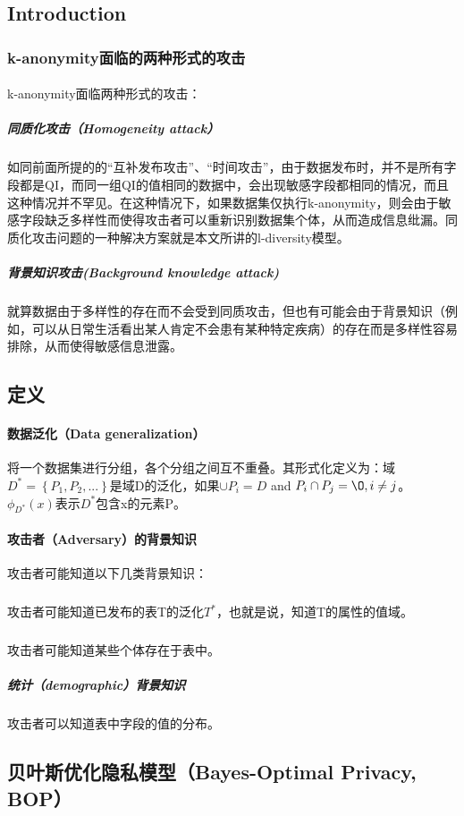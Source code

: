 \documentclass[12pt,a4paper]{article}
\begin{document}
\subsection{Introduction}
\subsubsection{k-anonymity面临的两种形式的攻击}
\paragraph{} k-anonymity面临两种形式的攻击：
	\subparagraph{同质化攻击（Homogeneity attack）} 如同前面所提的的“互补发布攻击”、“时间攻击”，由于数据发布时，并不是所有字段都是QI，而同一组QI的值相同的数据中，会出现敏感字段都相同的情况，而且这种情况并不罕见。在这种情况下，如果数据集仅执行k-anonymity，则会由于敏感字段缺乏多样性而使得攻击者可以重新识别数据集个体，从而造成信息纰漏。同质化攻击问题的一种解决方案就是本文所讲的l-diversity模型。
	\subparagraph{背景知识攻击(Background knowledge attack)} 就算数据由于多样性的存在而不会受到同质攻击，但也有可能会由于背景知识（例如，可以从日常生活看出某人肯定不会患有某种特定疾病）的存在而是多样性容易排除，从而使得敏感信息泄露。
	
\subsection{定义}
\paragraph{数据泛化（Data generalization）} 将一个数据集进行分组，各个分组之间互不重叠。其形式化定义为：域$D^*=\left \{P_1,P_2,...\right \}$是域D的泛化，如果$\cup P_i = D$ and $P_i \cap P_j = \O, i \neq j $。$\phi_{D^*}(x)$表示$D^*$包含x的元素P。

\paragraph{攻击者（Adversary）的背景知识} 攻击者可能知道以下几类背景知识：
	\subparagraph{} 攻击者可能知道已发布的表T的泛化$T^*$，也就是说，知道T的属性的值域。
	\subparagraph{} 攻击者可能知道某些个体存在于表中。
	\subparagraph{统计（demographic）背景知识} 攻击者可以知道表中字段的值的分布。

\subsection{贝叶斯优化隐私模型（Bayes-Optimal Privacy, BOP）}
\end{document}
